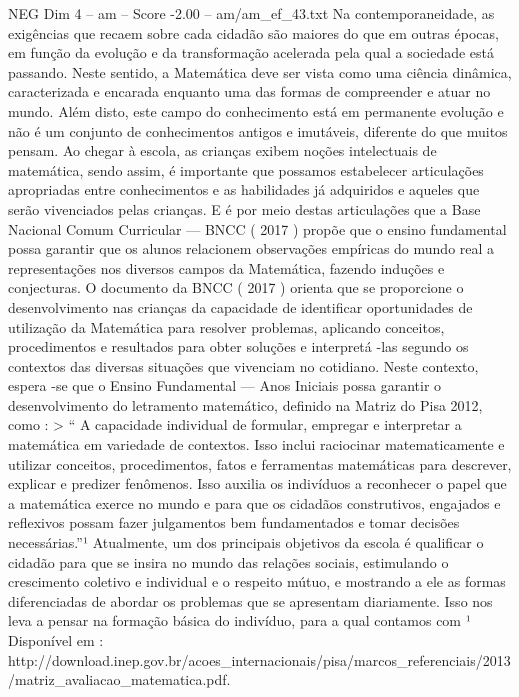 \begin{textsample}{NEG Dim 4 – am – Score -2.00 – am/am\_ef\_43.txt}  \label{ex:f4_neg_183}
Na contemporaneidade, as exigências que recaem sobre cada cidadão são maiores do que em outras épocas, em função da evolução e da transformação acelerada pela qual a sociedade está passando.
Neste sentido, a Matemática deve ser vista como uma ciência dinâmica, caracterizada e encarada enquanto uma das formas de compreender e atuar no mundo.
Além disto, este campo do conhecimento está em permanente evolução e não é um conjunto de conhecimentos antigos e imutáveis, diferente do que muitos pensam.
Ao chegar à escola, as crianças exibem noções intelectuais de matemática, sendo assim, é importante que possamos estabelecer articulações apropriadas entre conhecimentos e as habilidades já adquiridos e aqueles que serão vivenciados pelas crianças.
E é por meio destas articulações que a Base Nacional Comum Curricular — BNCC ( 2017 ) propõe que o ensino fundamental possa garantir que os alunos relacionem observações empíricas do mundo real a representações nos diversos campos da Matemática, fazendo induções e conjecturas.
O documento da BNCC ( 2017 ) orienta que se proporcione o desenvolvimento nas crianças da capacidade de identificar oportunidades de utilização da Matemática para resolver problemas, aplicando conceitos, procedimentos e resultados para obter soluções e interpretá -las segundo os contextos das diversas situações que vivenciam no cotidiano.
Neste contexto, espera -se que o Ensino Fundamental — Anos Iniciais possa garantir o desenvolvimento do letramento matemático, definido na Matriz do Pisa 2012, como : > “ A capacidade individual de formular, empregar e interpretar a matemática em variedade de contextos.
Isso inclui raciocinar matematicamente e utilizar conceitos, procedimentos, fatos e ferramentas matemáticas para descrever, explicar e predizer fenômenos.
Isso auxilia os indivíduos a reconhecer o papel que a matemática exerce no mundo e para que os cidadãos construtivos, engajados e reflexivos possam fazer julgamentos bem fundamentados e tomar decisões necessárias.”¹ Atualmente, um dos principais objetivos da escola é qualificar o cidadão para que se insira no mundo das relações sociais, estimulando o crescimento coletivo e individual e o respeito mútuo, e mostrando a ele as formas diferenciadas de abordar os problemas que se apresentam diariamente.
Isso nos leva a pensar na formação básica do indivíduo, para a qual contamos com ¹ Disponível em : http://download.inep.gov.br/acoes\_internacionais/pisa/marcos\_referenciais/2013/matriz\_avaliacao\_matematica.pdf.

\end{textsample}
